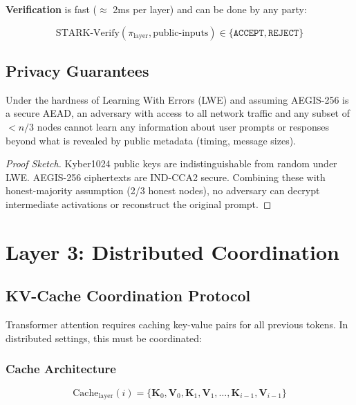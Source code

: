 \documentclass[11pt,a4paper]{article}
\newcommand{\vect}[1]{\mathbf{#1}}
\begin{document}
\textbf{Verification} is fast ($\approx$ 2ms per layer) and can be done by any party:

\begin{equation}
\text{STARK-Verify}(\pi_{\text{layer}}, \text{public-inputs}) \in \{\texttt{ACCEPT}, \texttt{REJECT}\}
\end{equation}

\subsection{Privacy Guarantees}

\begin{theorem}
Under the hardness of Learning With Errors (LWE) and assuming AEGIS-256 is a secure AEAD, an adversary with access to all network traffic and any subset of $<n/3$ nodes cannot learn any information about user prompts or responses beyond what is revealed by public metadata (timing, message sizes).
\end{theorem}

\begin{proof}[Proof Sketch]
Kyber1024 public keys are indistinguishable from random under LWE. AEGIS-256 ciphertexts are IND-CCA2 secure. Combining these with honest-majority assumption (2/3 honest nodes), no adversary can decrypt intermediate activations or reconstruct the original prompt.
\end{proof}

\newpage
\section{Layer 3: Distributed Coordination}

\subsection{KV-Cache Coordination Protocol}

Transformer attention requires caching key-value pairs for all previous tokens. In distributed settings, this must be coordinated:

\subsubsection{Cache Architecture}

\begin{equation}
\text{Cache}_{\text{layer}}(i) = \{\vect{K}_0, \vect{V}_0, \vect{K}_1, \vect{V}_1, \ldots, \vect{K}_{i-1}, \vect{V}_{i-1}\}
\end{equation}
\end{document}
